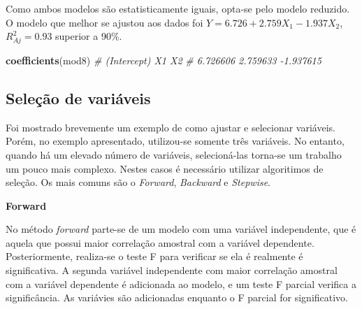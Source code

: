 \documentclass[
]{book}
\newenvironment{Shaded}{\begin{snugshade}}{\end{snugshade}}
\newcommand{\CommentTok}[1]{\textcolor[rgb]{0.56,0.35,0.01}{\textit{#1}}}
\newcommand{\KeywordTok}[1]{\textcolor[rgb]{0.13,0.29,0.53}{\textbf{#1}}}
\newcommand{\NormalTok}[1]{#1}
\numberwithin{equation}{section}
\newcommand{\indt}[1]{\index{#1|ST}}
\begin{document}
Como ambos modelos são estatisticamente iguais, opta-se pelo modelo reduzido. O modelo que melhor se ajustou aos dados foi \(Y = 6.726 + 2.759X_1 - 1.937X_2\), \(R^2_{Aj} = 0.93\) superior a 90\%.

\begin{Shaded}
\begin{Highlighting}[]
\KeywordTok{coefficients}\NormalTok{(mod8)}
\CommentTok{\# (Intercept)          X1          X2 }
\CommentTok{\#    6.726606    2.759633   {-}1.937615}
\end{Highlighting}
\end{Shaded}

\hypertarget{seleuxe7uxe3o-de-variuxe1veis}{%
\subsection{Seleção de variáveis}\label{seleuxe7uxe3o-de-variuxe1veis}}

Foi mostrado brevemente um exemplo de como ajustar e selecionar variáveis. Porém, no exemplo apresentado, utilizou-se somente três variáveis. No entanto, quando há um elevado número de variáveis, selecioná-las torna-se um trabalho um pouco mais complexo. Nestes casos é necessário utilizar algoritimos de seleção. Os mais comuns são o \emph{Forward}, \emph{Backward} e \emph{Stepwise}.

\textbf{Forward} \indt{forward}

No método \emph{forward} parte-se de um modelo com uma variável independente, que é aquela que possui maior correlação \indt{correlação} amostral com a variável dependente. Posteriormente, realiza-se o teste F para verificar se ela é realmente é significativa. A segunda variável independente com maior correlação amostral com a variável dependente é adicionada ao modelo, e um teste F parcial verifica a significância. As variávies são adicionadas enquanto o F parcial for significativo.
\end{document}
